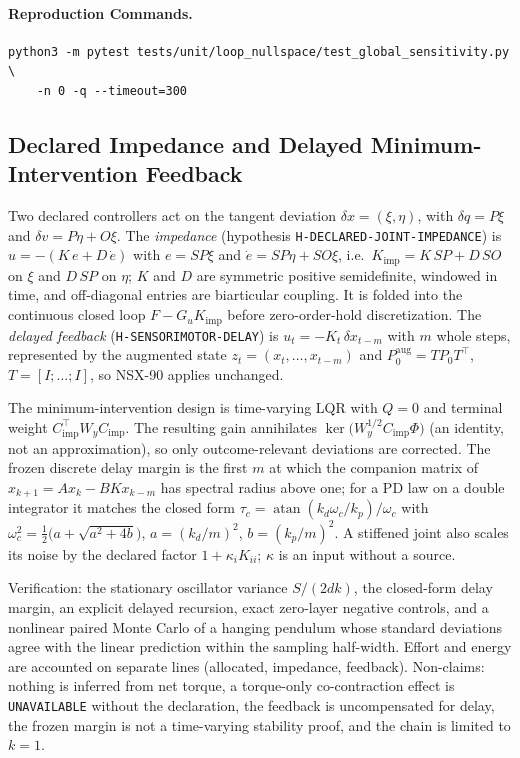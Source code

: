 \documentclass[11pt,a4paper]{article}
\begin{document}
\paragraph{Reproduction Commands.}
\begin{verbatim}
python3 -m pytest tests/unit/loop_nullspace/test_global_sensitivity.py \
    -n 0 -q --timeout=300
\end{verbatim}

\subsection{Declared Impedance and Delayed Minimum-Intervention Feedback}
\label{sec:var-layer}

Two declared controllers act on the tangent deviation
$\delta x=(\xi,\eta)$, with $\delta q=P\xi$ and $\delta v=P\eta+O\xi$.  The
\emph{impedance} (hypothesis \texttt{H-DECLARED-JOINT-IMPEDANCE}) is
$u=-(K\,e+D\,\dot e)$ with $e=SP\xi$ and $\dot e=SP\eta+SO\xi$, i.e.\
$K_{\mathrm{imp}}=K\,SP+D\,SO$ on $\xi$ and $D\,SP$ on $\eta$; $K$ and $D$ are
symmetric positive semidefinite, windowed in time, and off-diagonal entries
are biarticular coupling.  It is folded into the continuous closed loop
$F-G_uK_{\mathrm{imp}}$ before zero-order-hold discretization.  The
\emph{delayed feedback} (\texttt{H-SENSORIMOTOR-DELAY}) is
$u_t=-K_t\,\delta x_{t-m}$ with $m$ whole steps, represented by the augmented
state $z_t=(x_t,\dots,x_{t-m})$ and $P_0^{\mathrm{aug}}=TP_0T^{\top}$,
$T=[I;\dots;I]$, so NSX-90 applies unchanged.

The minimum-intervention design is time-varying LQR with $Q=0$ and terminal
weight $C_{\mathrm{imp}}^{\top}W_yC_{\mathrm{imp}}$.  The resulting gain
annihilates $\ker\!\big(W_y^{1/2}C_{\mathrm{imp}}\Phi\big)$ (an identity, not an
approximation), so only outcome-relevant deviations are corrected.  The
frozen discrete delay margin is the first $m$ at which the companion matrix of
$x_{k+1}=Ax_k-BKx_{k-m}$ has spectral radius above one; for a PD law on a
double integrator it matches the closed form
$\tau_c=\operatorname{atan}(k_d\omega_c/k_p)/\omega_c$ with
$\omega_c^2=\tfrac12\big(a+\sqrt{a^2+4b}\big)$, $a=(k_d/m)^2$, $b=(k_p/m)^2$.
A stiffened joint also scales its noise by the declared factor
$1+\kappa_iK_{ii}$; $\kappa$ is an input without a source.

Verification: the stationary oscillator variance $S/(2dk)$, the closed-form
delay margin, an explicit delayed recursion, exact zero-layer negative
controls, and a nonlinear paired Monte Carlo of a hanging pendulum whose
standard deviations agree with the linear prediction within the sampling
half-width.  Effort and energy are accounted on separate lines
(allocated, impedance, feedback).  Non-claims: nothing is inferred from net
torque, a torque-only co-contraction effect is \texttt{UNAVAILABLE} without the
declaration, the feedback is uncompensated for delay, the frozen margin is not
a time-varying stability proof, and the chain is limited to $k=1$.
\end{document}
